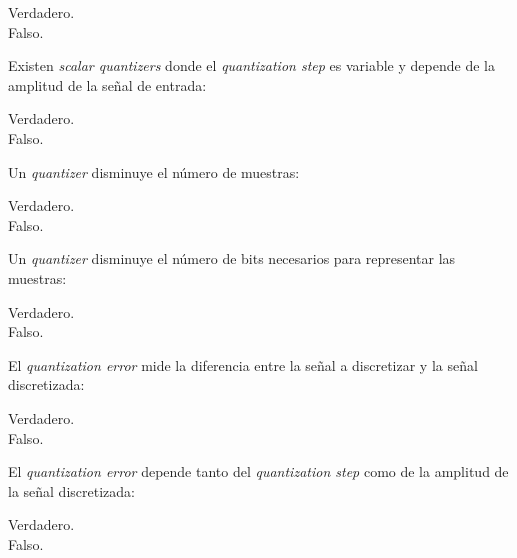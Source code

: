 \documentclass[legalpaper, 12pt, addpoints]{exam}
\begin{document}
\begin{questions}
\begin{oneparchoices}
  \choice Verdadero.\\
  \choice Falso.
\end{oneparchoices}
  
\vspace{0.10in}

\question Existen \emph{scalar quantizers} donde el \emph{quantization
  step} es variable y depende de la amplitud de la señal de entrada:

\begin{oneparchoices}
  \choice Verdadero.\\
  \choice Falso.
\end{oneparchoices}
  
\vspace{0.10in}

\question Un \emph{quantizer} disminuye el número de muestras:

\begin{oneparchoices}
  \choice Verdadero.\\
  \choice Falso.
\end{oneparchoices}
  
\vspace{0.10in}

\question Un \emph{quantizer} disminuye el número de bits necesarios para representar las muestras:

\begin{oneparchoices}
  \choice Verdadero.\\
  \choice Falso.
\end{oneparchoices}
  
\vspace{0.10in}

\question El \emph{quantization error} mide la diferencia entre la
señal a discretizar y la señal discretizada:

\begin{oneparchoices}
  \choice Verdadero.\\
  \choice Falso.
\end{oneparchoices}
  
\vspace{0.10in}

\question El \emph{quantization error} depende tanto del
\emph{quantization step} como de la amplitud de la señal discretizada:

\begin{oneparchoices}
  \choice Verdadero.\\
  \choice Falso.
\end{oneparchoices}
  

\end{questions}
\end{document}
